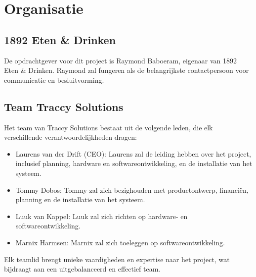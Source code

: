 \section{Organisatie}
\subsection{1892 Eten \& Drinken}
De opdrachtgever voor dit project is Raymond Baboeram, eigenaar van 1892 Eten \& Drinken. Raymond zal fungeren als de belangrijkste contactpersoon voor communicatie en besluitvorming.

\subsection{Team Traccy Solutions}
Het team van Traccy Solutions bestaat uit de volgende leden, die elk verschillende verantwoordelijkheden dragen:

\begin{itemize}
    \item Laurens van der Drift (CEO): Laurens zal de leiding hebben over het project, inclusief planning, hardware en softwareontwikkeling, en de installatie van het systeem.
    \item Tommy Dobos: Tommy zal zich bezighouden met productontwerp, financiën, planning en de installatie van het systeem.
    \item Luuk van Kappel: Luuk zal zich richten op hardware- en softwareontwikkeling.
    \item Marnix Harmsen: Marnix zal zich toeleggen op softwareontwikkeling.
\end{itemize}

Elk teamlid brengt unieke vaardigheden en expertise naar het project, wat bijdraagt aan een uitgebalanceerd en effectief team.
